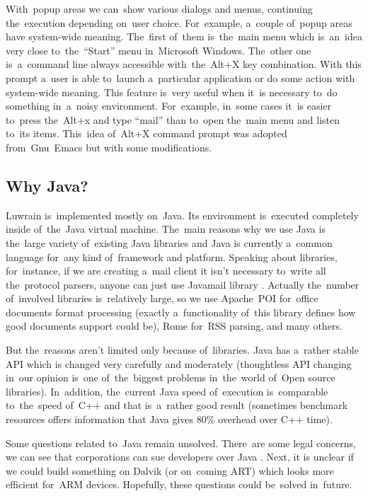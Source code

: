 \documentclass{acm_proc_article-sp}
\begin{document}
With~popup areas we can~show various dialogs and menus,
continuing the~execution depending on~user choice.
For~example, a~couple of~popup areas have system-wide meaning.
The~first of~them is~the~main menu which is~an~idea very close to~the~``Start'' menu in~Microsoft Windows.
The~other one is~a~command line always accessible with~the~Alt+X key combination.
With this prompt a~user is able to~launch  a~particular application or do some action with system-wide meaning.
This feature is~very useful when it~is necessary to~do something in~a~noisy environment.
For~example, in~some cases it~is easier to~press the~Alt+x and type ``mail'' than to~open the~main menu and listen to~its items.
This~idea of~Alt+X command prompt was adopted from~Gnu~Emacs but with some modifications.

\subsection{Why Java?}

Luwrain is~implemented mostly on~Java.
Its environment is~executed completely inside of~the~Java virtual machine.
The~main reasons why we use Java is the~large variety of~existing Java libraries
and Java is currently a~common language for~any kind of~framework and platform.
Speaking about libraries, for~instance, if  we are creating a~mail client it isn't necessary to~write all the~protocol parsers,
anyone can just use Javamail library \cite{javamail}.
Actually the~number of~involved libraries is~relatively large,
so we use Apache~POI \cite{poi} for~office documents format processing 
(exactly a~functionality of~this library defines how good documents support could be),
Rome \cite{rome} for~RSS parsing,  
and many others.

But the~reasons aren't limited only because of~libraries.
Java has a~rather stable API which is changed very carefully and moderately 
(thoughtless API changing in~our opinion is~one of~the~biggest problems in~the~world of~Open source libraries).
In~addition, \cite{javaspeed} 
the~current Java speed of~execution is~comparable to~the~speed of~C++
and that is~a~rather good result
(sometimes benchmark resources offers information that Java gives 80\% overhead over C++ time).

Some questions related to~Java remain unsolved. 
There~are some legal concerns, we can see that corporations can sue developers over Java \cite{oraclesue}.
Next, it is unclear if we could build something on Dalvik (or on~coming ART) \cite{dalvik}
which looks more efficient for~ARM devices.
Hopefully, these questions could be~solved in~future.
\end{document}
